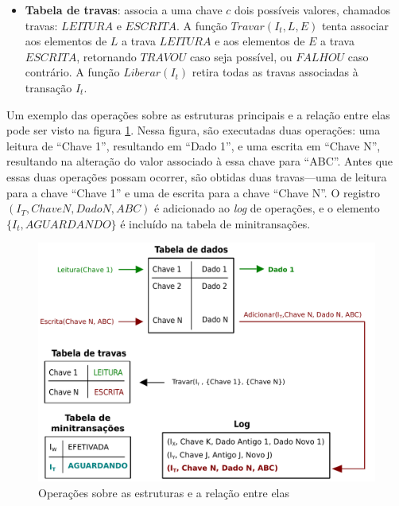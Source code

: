 \documentclass[11pt,twoside,a4paper]{book}
\begin{document}
\begin{itemize}
    \item \textbf{Tabela de travas}: associa a uma chave $c$ dois possíveis valores, chamados travas: $LEITURA$ e $ESCRITA$. A função $Travar(I_t, L, E)$ tenta associar aos elementos de $L$ a trava $LEITURA$ e aos elementos de $E$ a trava $ESCRITA$, retornando $TRAVOU$ caso seja possível, ou $FALHOU$ caso contrário. A função $Liberar(I_t)$ retira todas as travas associadas à transação $I_t$.
\end{itemize}

Um exemplo das operações sobre as estruturas principais e a relação entre elas pode ser visto na figura \ref{fig:estruturas}. Nessa figura, são executadas duas operações: uma leitura de ``Chave 1'', resultando em ``Dado 1'', e uma escrita em ``Chave N'', resultando na alteração do valor associado à essa chave para ``ABC''. Antes que essas duas operações possam ocorrer, são obtidas duas travas---uma de leitura para a chave ``Chave 1'' e uma de escrita para a chave ``Chave N''. O registro $(I_T, Chave N, Dado N, ABC)$ é adicionado ao \emph{log} de operações, e o elemento $\{I_t, AGUARDANDO\}$ é incluído na tabela de minitransações.

\begin{figure}
  \centering
  \includegraphics[width=.90\textwidth]{estruturas} 
  \caption{Operações sobre as estruturas e a relação entre elas}
  \label{fig:estruturas} 
\end{figure}
\end{document}
